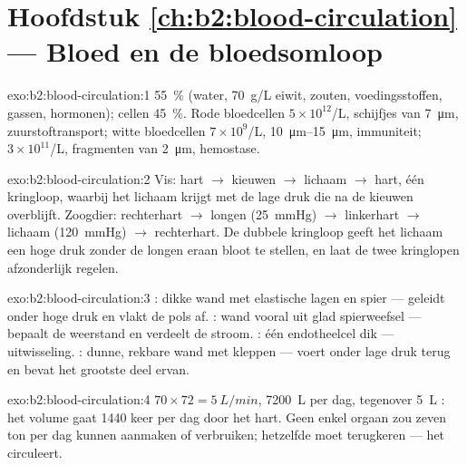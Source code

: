 \section*{Hoofdstuk \ref{ch:b2:blood-circulation} --- Bloed en de bloedsomloop}

\begin{solution}{exo:b2:blood-circulation:1}
 \qty{55}{\%} (water, \qty{70}{g/L} eiwit, zouten, voedingsstoffen,
gassen, hormonen); cellen \qty{45}{\%}. Rode bloedcellen $5\times
10^{12}$/L, schijfjes van \qty{7}{\micro m}, zuurstoftransport; witte
bloedcellen $7\times 10^{9}$/L, \qtyrange{10}{15}{\micro m}, immuniteit;
 $3\times 10^{11}$/L, fragmenten van \qty{2}{\micro m},
hemostase.
\end{solution}

\begin{solution}{exo:b2:blood-circulation:2}
Vis: hart $\to$ kieuwen $\to$ lichaam $\to$ hart, één kringloop, waarbij
het lichaam  krijgt met de lage druk die na de kieuwen overblijft.
Zoogdier: rechterhart $\to$ longen (\qty{25}{mmHg}) $\to$ linkerhart $\to$
lichaam (\qty{120}{mmHg}) $\to$ rechterhart. De dubbele kringloop geeft het
lichaam een hoge druk zonder de longen eraan bloot te stellen, en laat de
twee kringlopen afzonderlijk regelen.
\end{solution}

\begin{solution}{exo:b2:blood-circulation:3}
: dikke wand met elastische lagen en spier --- geleidt  onder
hoge druk en vlakt de pols af. : wand vooral uit glad spierweefsel
--- bepaalt de weerstand en verdeelt de stroom. : één endotheelcel
dik --- uitwisseling. : dunne, rekbare wand met kleppen --- voert
 onder lage druk terug en bevat het grootste deel ervan.
\end{solution}

\begin{solution}{exo:b2:blood-circulation:4}
$70\times 72 = \qty{5}{L/min}$, \qty{7200}{L} per dag, tegenover
\qty{5}{L} : het volume gaat \num{1440} keer per dag door het hart.
Geen enkel orgaan zou zeven ton  per dag kunnen aanmaken of verbruiken;
hetzelfde  moet terugkeren --- het circuleert.
\end{solution}

